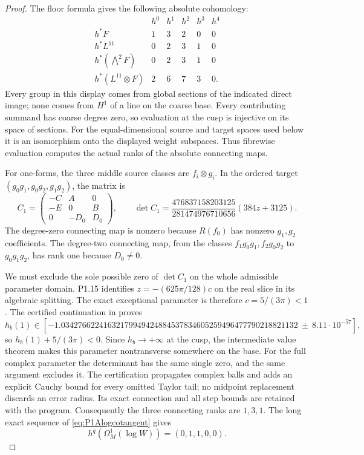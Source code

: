 \begin{proof}
The floor formula gives the following absolute cohomology:
\[
\begin{array}{c|ccccc}
&h^0&h^1&h^2&h^3&h^4\\\hline
h^*F&1&3&2&0&0\\
h^*L^{11}&0&2&3&1&0\\
h^*(\bigwedge^2F)&0&2&3&1&0\\
h^*(L^{11}\otimes F)&2&6&7&3&0.
\end{array}
\]
Every group in this display comes from global sections of the
indicated direct image; none comes from $H^1$ of a line on the
coarse base. Every contributing summand has coarse degree zero,
so evaluation at the cusp is injective on its space of sections.
For the equal-dimensional source and target spaces used below
it is an isomorphism onto the displayed weight subspaces.
Thus fibrewise evaluation computes the actual ranks of the
absolute connecting maps.

For one-forms, the three middle source classes are $f_i\otimes g_i$.
In the ordered target $(g_0g_1,g_0g_2,g_1g_2)$, the matrix is
\[
C_1=\begin{pmatrix}-C&A&0\\-E&0&B\\0&-D_0&D_0\end{pmatrix},
\qquad
\det C_1=
\frac{476837158203125}{281474976710656}(384z+3125).
\]
The degree-zero connecting map is nonzero because $R(f_0)$
has nonzero $g_1,g_2$ coefficients. The degree-two connecting
map, from the classes $f_1g_0g_1,f_2g_0g_2$ to $g_0g_1g_2$,
has rank one because $D_0\ne0$.

We must exclude the sole possible zero of $\det C_1$ on the
whole admissible parameter domain. P1.15 identifies
$z=-(625\pi/128)c$ on the real slice in its algebraic splitting.
The exact exceptional parameter is therefore $c=5/(3\pi)<1$.
The certified continuation in
 proves
\[
h_b(1)\in[-1.03427662241632179949424884537834605259496477790218821132
          \ \mathbin{\pm}\ 8.11\cdot10^{-57}],
\]
so $h_b(1)+5/(3\pi)<0$. Since $h_b\to+\infty$ at the cusp,
the intermediate value theorem makes this parameter
nontransverse somewhere on the base. For the full complex
parameter the determinant has the same single zero, and the
same argument excludes it. The certification propagates complex
balls and adds an explicit Cauchy bound for every omitted
Taylor tail; no midpoint replacement discards an error radius.
Its exact connection and all step bounds are retained with the
program. Consequently the three connecting ranks are $1,3,1$.
The long exact sequence of \eqref{eq:P1Alogcotangent} gives
\[
h^q(\Omega_M^1(\log W))=(0,1,1,0,0).
\]


\end{proof}
